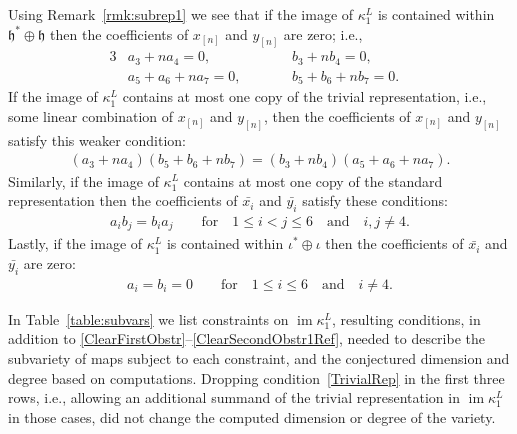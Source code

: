 \documentclass[10pt,a4paper]{amsart}
\numberwithin{equation}{section}
\DeclareMathOperator{\im}{im}
\begin{document}
Using Remark~\ref{rmk:subrep1} we see that if the image of $\kappa^L_1$ is contained within $\mathfrak{h}^*\oplus \mathfrak{h}$
then the coefficients of $x_{[n]}$ and $y_{[n]}$ are zero;
i.e.,
\begin{alignat}{3}
\label{DoubledStdRepa}
& a_3+na_4=0, \qquad && b_3+nb_4=0,& \\
\label{DoubledStdRepb}
& a_5+a_6+na_7=0, \qquad && b_5+b_6+nb_7=0.&
\end{alignat}
If the image of $\kappa^L_1$ contains at most one copy of the trivial representation,
i.e., some linear combination of $x_{[n]}$ and $y_{[n]}$, then the coefficients of
$x_{[n]}$ and $y_{[n]}$ satisfy this weaker condition:
\begin{gather}\label{TrivialRep}
(a_3+na_4)(b_5+b_6+nb_7)=(b_3+nb_4)(a_5+a_6+na_7).
\end{gather}
Similarly, if the image of $\kappa^L_1$ contains at most one copy of the standard representation
then the coefficients of $\bar{x_i}$ and $\bar{y_i}$ satisfy these conditions:
\begin{gather}\label{StdRep}
a_i b_j=b_i a_j \qquad \text{for}\quad 1\leq i<j \leq 6\quad \text{and}\quad i,j \neq 4.
\end{gather}
Lastly, if the image of $\kappa^L_1$ is contained within $\iota^* \oplus \iota$
then the coefficients of $\bar{x_i}$ and $\bar{y_i}$ are zero:
\begin{gather}\label{DoubledTrivialRep}
a_i=b_i=0 \qquad \text{for}\quad 1\leq i \leq 6 \quad\text{and}\quad i \neq 4.
\end{gather}

In Table~\ref{table:subvars} we list constraints on $\im \kappa^L_1$,
resulting conditions, in addition to \eqref{ClearFirstObstr}--\eqref{ClearSecondObstr1Ref},
needed to describe the subvariety of maps subject to each constraint,
and the conjectured dimension and degree based on computations.
Dropping condition~\eqref{TrivialRep} in the first three rows, i.e., allowing an additional summand of the trivial representation in $\im \kappa^L_1$ in those cases, did not change the computed dimension or degree of the variety.
\end{document}
